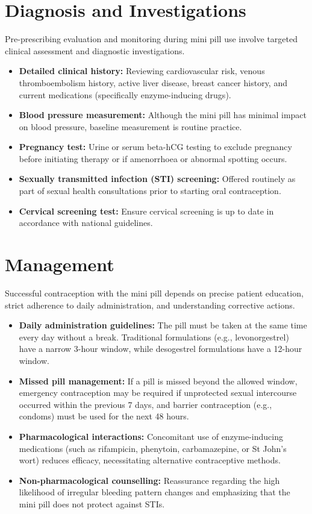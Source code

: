 \section*{Diagnosis and Investigations}
Pre-prescribing evaluation and monitoring during mini pill use involve targeted clinical assessment and diagnostic investigations.
\begin{itemize}
    \item \textbf{Detailed clinical history:} Reviewing cardiovascular risk, venous thromboembolism history, active liver disease, breast cancer history, and current medications (specifically enzyme-inducing drugs).
    \item \textbf{Blood pressure measurement:} Although the mini pill has minimal impact on blood pressure, baseline measurement is routine practice.
    \item \textbf{Pregnancy test:} Urine or serum beta-hCG testing to exclude pregnancy before initiating therapy or if amenorrhoea or abnormal spotting occurs.
    \item \textbf{Sexually transmitted infection (STI) screening:} Offered routinely as part of sexual health consultations prior to starting oral contraception.
    \item \textbf{Cervical screening test:} Ensure cervical screening is up to date in accordance with national guidelines.
\end{itemize}

\section*{Management}
Successful contraception with the mini pill depends on precise patient education, strict adherence to daily administration, and understanding corrective actions.
\begin{itemize}
    \item \textbf{Daily administration guidelines:} The pill must be taken at the same time every day without a break. Traditional formulations (e.g., levonorgestrel) have a narrow 3-hour window, while desogestrel formulations have a 12-hour window.
    \item \textbf{Missed pill management:} If a pill is missed beyond the allowed window, emergency contraception may be required if unprotected sexual intercourse occurred within the previous 7 days, and barrier contraception (e.g., condoms) must be used for the next 48 hours.
    \item \textbf{Pharmacological interactions:} Concomitant use of enzyme-inducing medications (such as rifampicin, phenytoin, carbamazepine, or St John's wort) reduces efficacy, necessitating alternative contraceptive methods.
    \item \textbf{Non-pharmacological counselling:} Reassurance regarding the high likelihood of irregular bleeding pattern changes and emphasizing that the mini pill does not protect against STIs.
\end{itemize}

